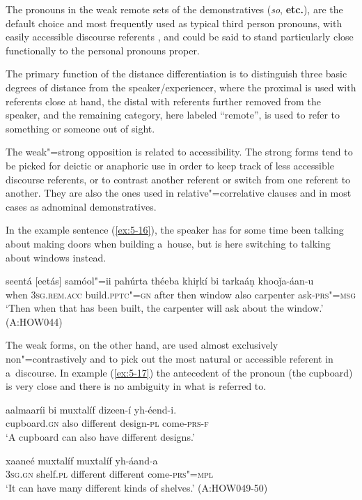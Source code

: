 The pronouns in the weak remote sets of the demonstratives (\textit{so}, \textbf{etc.}), are the default choice and most frequently used as typical third person pronouns, with easily accessible discourse referents \citep[432--433]{diessel2006}, and could be said to stand particularly close functionally to the personal pronouns proper. 

The primary function of the distance differentiation is to distinguish three basic degrees of distance from the speaker/experiencer, where the proximal is used with referents close at hand, the distal with referents further removed from the speaker, and the remaining category, here labeled ``remote'', is used to refer to something or someone out of sight. 


The weak"=strong opposition is related to accessibility. The strong forms tend to be picked for deictic or anaphoric use in order to keep track of less accessible discourse referents, or to contrast another referent or switch from one referent to another. They are also the ones used in relative"=correlative clauses and in most cases as adnominal demonstratives. 


In the example sentence (\ref{ex:5-16}), the speaker has for some time been talking about making doors when building a~house, but is here switching to talking about windows instead.


\begin{exe}
\ex
\label{ex:5-16}
\gll seentá [eetás] samóol"=ii pahúrta théeba khiṛkí bi tarkaáṇ
khooǰa-áan-u  \\
when \textsc{3sg}.\textsc{rem.acc} build.\textsc{pptc"=gn} after then window also carpenter ask-\textsc{prs"=msg} \\
\glt `Then when that has been built, the carpenter will ask about the window.' (A:HOW044)
\end{exe}

The weak forms, on the other hand, are used almost exclusively non"=contrastively and to pick out the
most natural or accessible referent in a~discourse. In example (\ref{ex:5-17}) the antecedent of the pronoun
(the cupboard) is very close and there is no ambiguity in what is referred to.

\begin{exe}
\ex
\label{ex:5-17}
\gll aalmaaríi bi muxtalíf dizeen-í yh-éend-i. \\
cupboard.\textsc{gn} also different design-\textsc{pl} come-\textsc{prs-f} \\
\glt `A cupboard can also have different designs.' 

\gll [tasíi] xaaneé muxtalíf muxtalíf yh-áand-a \\
\textsc{3sg.gn} shelf.\textsc{pl} different different come-\textsc{prs"=mpl} \\
\glt `It can have many different kinds of shelves.' (A:HOW049-50)
\end{exe}

